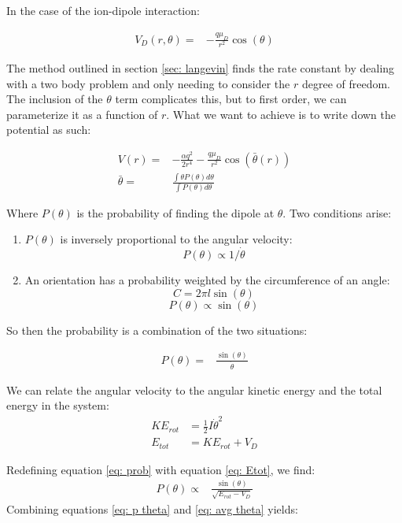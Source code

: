 In the case of the ion-dipole interaction:

\begin{align}
V_D(r, \theta) = & -\frac{q\mu_D}{r^2} \cos(\theta)
\end{align}

The method outlined in section \ref{sec: langevin} finds the rate constant by dealing with a two body problem and only needing to consider the $r$ degree of freedom. The inclusion of the $\theta$ term complicates this, but to first order, we can parameterize it as a function of $r$. What we want to achieve is to write down the potential as such:

\begin{align}
    V(r) =& -\frac{\alpha q^2}{2r^4} - \frac{q\mu_D}{r^2} \cos\left(\bar{\theta}(r)\right) \nonumber \\
    \bar{\theta} = & \frac{\int \theta P(\theta) d\theta}{\int P(\theta) d\theta} \label{eq: avg theta}
\end{align}

Where $P(\theta)$ is the probability of finding the dipole at $\theta$. Two conditions arise:

\begin{enumerate}
\item $P(\theta)$ is inversely proportional to the angular velocity:
$$P(\theta) \propto 1/\dot{\theta}$$
\item An orientation has a probability weighted by the circumference of an angle:
$$C=2\pi l \sin(\theta)$$
$$ P(\theta) \propto \sin(\theta) $$
\end{enumerate}

So then the probability is a combination of the two situations:

\begin{align}
    P(\theta)=&\frac{\sin(\theta)}{\dot{\theta}} \label{eq: prob}
\end{align}

We can relate the angular velocity to the angular kinetic energy and the total energy in the system:
\begin{align}
    KE_{rot} & = \frac{1}{2}I\dot{\theta}^2 \nonumber \\
    E_{tot} & = KE_{rot} + V_D \label{eq: Etot}
\end{align}

Redefining equation \ref{eq: prob} with equation \ref{eq: Etot}, we find:
\begin{align}
    P(\theta) \propto & \frac{\sin(\theta)}{\sqrt{E_{rot}-V_D}} \label{eq: p theta}
\end{align}
%
Combining equations \ref{eq: p theta} and \ref{eq: avg theta} yields:

